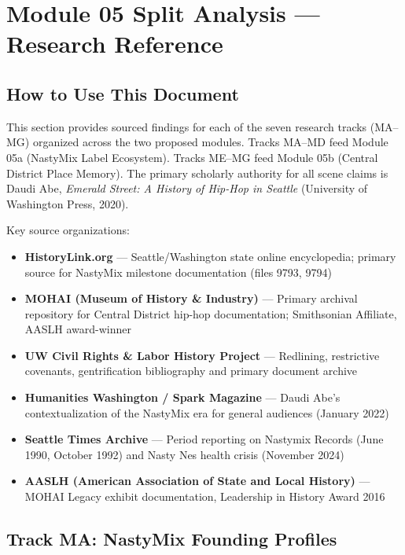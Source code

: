 \documentclass[11pt,letterpaper]{article}
\newcommand{\stageheader}[2]{%
  \noindent\colorbox{#2}{\makebox[\textwidth][l]{%
    \textcolor{white}{\bfseries\sffamily\hspace{6pt}#1\hspace{6pt}}}}%
  \vspace{0.5em}\par%
}
\begin{document}
\newpage
\stageheader{STAGE 2 --- RESEARCH REFERENCE}{secondary}

\section{Module 05 Split Analysis --- Research Reference}

\subsection{How to Use This Document}

This section provides sourced findings for each of the seven research tracks (MA--MG) organized
across the two proposed modules. Tracks MA--MD feed Module 05a (NastyMix Label Ecosystem).
Tracks ME--MG feed Module 05b (Central District Place Memory). The primary scholarly authority
for all scene claims is Daudi Abe, \textit{Emerald Street: A History of Hip-Hop in Seattle}
(University of Washington Press, 2020).

Key source organizations:
\begin{itemize}
\item \textbf{HistoryLink.org} --- Seattle/Washington state online encyclopedia; primary source for
   NastyMix milestone documentation (files 9793, 9794)
\item \textbf{MOHAI (Museum of History \& Industry)} --- Primary archival repository for Central
   District hip-hop documentation; Smithsonian Affiliate, AASLH award-winner
\item \textbf{UW Civil Rights \& Labor History Project} --- Redlining, restrictive covenants,
   gentrification bibliography and primary document archive
\item \textbf{Humanities Washington / Spark Magazine} --- Daudi Abe's contextualization of the
   NastyMix era for general audiences (January 2022)
\item \textbf{Seattle Times Archive} --- Period reporting on Nastymix Records (June 1990,
   October 1992) and Nasty Nes health crisis (November 2024)
\item \textbf{AASLH (American Association of State and Local History)} --- MOHAI Legacy exhibit
   documentation, Leadership in History Award 2016
\end{itemize}

\subsection{Track MA: NastyMix Founding Profiles}
\end{document}
